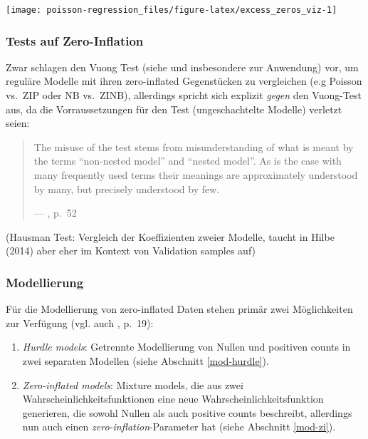 \documentclass[ngerman,a4paper,]{scrartcl}
\providecommand{\tightlist}{%
  \setlength{\itemsep}{0pt}\setlength{\parskip}{0pt}}
\theoremstyle{definition}
\theoremstyle{definition}
\theoremstyle{definition}
\theoremstyle{remark}
\begin{document}
\begin{center}\texttt{[image: poisson-regression\_files/figure-latex/excess\_zeros\_viz-1]} \end{center}

\hypertarget{tests-auf-zero-inflation}{%
\subsubsection*{Tests auf Zero-Inflation}\label{tests-auf-zero-inflation}}

Zwar schlagen \citet{perumean-chaneyZeroinflatedOverdispersedWhat2013} den Vuong Test (siehe \citet{vuongLikelihoodRatioTests1989} und insbesondere \citet{desmarais2013TestingZero} zur Anwendung) vor, um reguläre Modelle mit ihren zero-inflated Gegenstücken zu vergleichen (e.g Poisson vs.~ZIP oder NB vs.~ZINB), allerdings spricht sich \citet{wilson2015MisuseVuong} explizit \emph{gegen} den Vuong-Test aus, da die Vorraussetzungen für den Test (ungeschachtelte Modelle) verletzt seien:

\begin{quote}
The misuse of the test stems from misunderstanding of what is meant by the terms \enquote{non-nested model} and \enquote{nested model}. As is the case with many frequently used terms their meanings are approximately understood by many, but precisely understood by few.

--- \citet{wilson2015MisuseVuong}, p.~52
\end{quote}

(Hausman Test: Vergleich der Koeffizienten zweier Modelle, taucht in Hilbe (2014) aber eher im Kontext von Validation samples auf)

\hypertarget{modellierung}{%
\subsubsection*{Modellierung}\label{modellierung}}

Für die Modellierung von zero-inflated Daten stehen primär zwei Möglichkeiten zur Verfügung (vgl. auch \citet{hilbeModelingCountData2014}, p.~19):

\begin{enumerate}
\def\labelenumi{\arabic{enumi}.}
\tightlist
\item
  \emph{Hurdle models}: Getrennte Modellierung von Nullen und positiven counts in zwei separaten Modellen (siehe Abschnitt \ref{mod-hurdle}).
\item
  \emph{Zero-inflated models}: Mixture models, die aus zwei Wahrscheinlichkeitsfunktionen eine neue Wahrscheinlichkeitsfunktion generieren, die sowohl Nullen als auch positive counts beschreibt, allerdings nun auch einen \emph{zero-inflation}-Parameter hat (siehe Abschnitt \ref{mod-zi}).
\end{enumerate}
\end{document}

